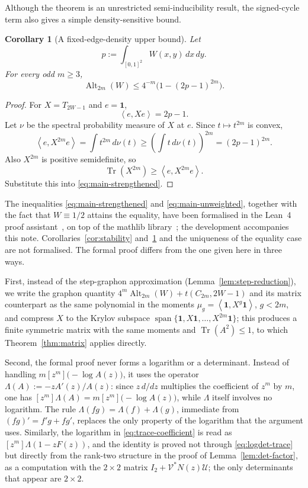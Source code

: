 \documentclass[11pt]{article}
\newtheorem{corollary}[theorem]{Corollary}
\newcommand{\one}{\mathbf{1}}
\newcommand{\ip}[2]{\left\langle #1,#2\right\rangle}
\newcommand{\Tr}{\operatorname{Tr}}
\newcommand{\Alt}{\operatorname{Alt}}
\begin{document}
Although the theorem is an unrestricted semi-inducibility result, the
signed-cycle term also gives a simple density-sensitive bound.

\begin{corollary}[A fixed-edge-density upper bound]
\label{cor:fixed-density}
Let
\[
  p:=\int_{[0,1]^2}W(x,y)\,dx\,dy.
\]
For every odd $m\ge3$,
\begin{equation}
  \Alt_{2m}(W)
  \le
  4^{-m}\bigl(1-(2p-1)^{2m}\bigr).
  \label{eq:fixed-density}
\end{equation}
\end{corollary}

\begin{proof}
For $X=T_{2W-1}$ and $e=\one$,
\[
  \ip{e}{Xe}=2p-1.
\]
Let $\nu$ be the spectral probability measure of $X$ at $e$.  Since
$t\mapsto t^{2m}$ is convex,
\[
  \ip{e}{X^{2m}e}
  =\int t^{2m}\,d\nu(t)
  \ge
  \left(\int t\,d\nu(t)\right)^{2m}
  =(2p-1)^{2m}.
\]
Also $X^{2m}$ is positive semidefinite, so
\[
  \Tr(X^{2m})\ge\ip{e}{X^{2m}e}.
\]
Substitute this into \eqref{eq:main-strengthened}.
\end{proof}

The inequalities \eqref{eq:main-strengthened} and
\eqref{eq:main-unweighted}, together with the fact that $W\equiv1/2$
attains the equality, have been formalised in the Lean~4 proof
assistant~\cite{Lean4}, on top of the mathlib
library~\cite{mathlib}; the development accompanies this note.
Corollaries~\ref{cor:stability} and~\ref{cor:fixed-density} and the
uniqueness of the equality case are not formalised.  The formal proof
differs from the one given here in three ways.

First, instead of the step-graphon approximation
(Lemma~\ref{lem:step-reduction}), we write the graphon quantity
$4^m\Alt_{2m}(W)+t(C_{2m},2W-1)$ and its matrix counterpart as the
same polynomial in the moments $\mu_g=\ip{\one}{X^g\one}$, $g<2m$,
and compress $X$ to the Krylov subspace
$\operatorname{span}\{\one,X\one,\ldots,X^{2m}\one\}$; this produces
a finite symmetric matrix with the same moments and $\Tr(A^2)\le1$,
to which Theorem~\ref{thm:matrix} applies directly.

Second, the formal proof never forms a logarithm or a determinant.
Instead of handling $m[z^m]\bigl(-\log A(z)\bigr)$, it uses the
operator $\Lambda(A):=-zA'(z)/A(z)$: since $z\,d/dz$ multiplies the
coefficient of $z^m$ by $m$, one has
$[z^m]\Lambda(A)=m[z^m]\bigl(-\log A(z)\bigr)$, while $\Lambda$
itself involves no logarithm.  The rule
$\Lambda(fg)=\Lambda(f)+\Lambda(g)$, immediate from
$(fg)'=f'g+fg'$, replaces the only property of the logarithm that
the argument uses.  Similarly, the logarithm in
\eqref{eq:trace-coefficient} is read as $[z^m]\Lambda(1-zF(z))$, and
the identity is proved not through \eqref{eq:logdet-trace} but
directly from the rank-two structure in the proof of
Lemma~\ref{lem:det-factor}, as a computation with the $2\times2$
matrix $I_2+\mathcal V^*N(z)\mathcal U$; the only determinants that
appear are $2\times2$.
\end{document}
